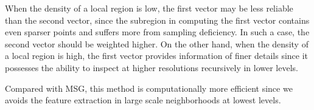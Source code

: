 When the density of a local region is low, the first vector may be less reliable than the second vector, since the subregion in computing the first vector contains even sparser points and suffers more from sampling deficiency. In such a case, the second vector should be weighted higher. On the other hand, when the density of a local region is high, the first vector provides information of finer details since it possesses the ability to inspect at higher resolutions recursively in lower levels.


Compared with MSG, this method is computationally more efficient since we avoids the feature extraction in large scale neighborhoods at lowest levels. %



